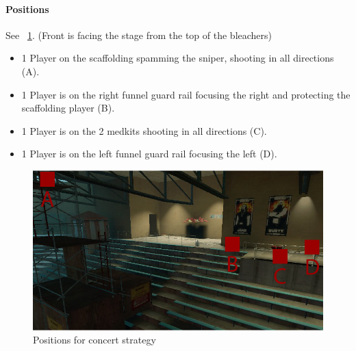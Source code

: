 \paragraph{Positions}
See \figurename\ \ref{fig:concert_positions}. (Front is facing the stage from the top of the bleachers)
\begin{itemize}
\item 1 Player on the scaffolding spamming the sniper, shooting in all directions (A).
\item 1 Player is on the right funnel guard rail focusing the right and protecting the scaffolding player (B).
\item 1 Player is on the 2 medkits shooting in all directions (C).
\item 1 Player is on the left funnel guard rail focusing the left (D).
\end{itemize}

\begin{figure}[htb!]
\centering
\includegraphics[width=0.70\columnwidth]{conc/concert_positions}
\caption{Positions for concert strategy}
\label{fig:concert_positions}
\end{figure}

